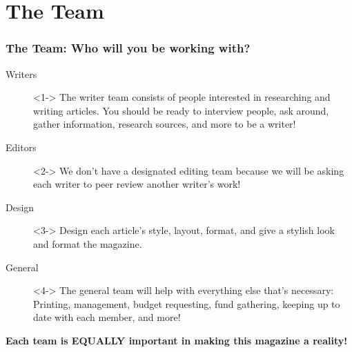 \documentclass{beamer}
\begin{document}
\section{The Team}
\begin{frame}
    \frametitle{The Team: Who will you be working with?}

        \begin{description}
            \item[Writers]<1-> The writer team consists of people interested in researching and writing articles. You should be ready to interview people, ask around, gather information, research sources, and more to be a writer! 

            \item[Editors]<2-> We don't have a designated editing team because we will be asking each writer to peer review another writer's work! 

            \item[Design]<3-> Design each article's style, layout, format, and give a stylish look and format the magazine.

            \item[General]<4-> The general team will help with everything else that's necessary: Printing, management, budget requesting, fund gathering, keeping up to date with each member, and more!

        \end{description}

        \pause
        \pause
        \pause
        \pause
        \textbf{Each team is EQUALLY important in making this magazine a reality!}

\end{frame}


\end{document}
